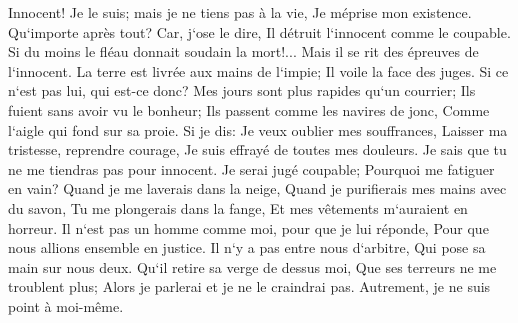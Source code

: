 \verse Innocent! Je le suis; mais je ne tiens pas à la vie, Je méprise mon existence. 
\verse Qu`importe après tout? Car, j`ose le dire, Il détruit l`innocent comme le coupable. 
\verse Si du moins le fléau donnait soudain la mort!... Mais il se rit des épreuves de l`innocent. 
\verse La terre est livrée aux mains de l`impie; Il voile la face des juges. Si ce n`est pas lui, qui est-ce donc? 
\verse Mes jours sont plus rapides qu`un courrier; Ils fuient sans avoir vu le bonheur; 
\verse Ils passent comme les navires de jonc, Comme l`aigle qui fond sur sa proie. 
\verse Si je dis: Je veux oublier mes souffrances, Laisser ma tristesse, reprendre courage, 
\verse Je suis effrayé de toutes mes douleurs. Je sais que tu ne me tiendras pas pour innocent. 
\verse Je serai jugé coupable; Pourquoi me fatiguer en vain? 
\verse Quand je me laverais dans la neige, Quand je purifierais mes mains avec du savon, 
\verse Tu me plongerais dans la fange, Et mes vêtements m`auraient en horreur. 
\verse Il n`est pas un homme comme moi, pour que je lui réponde, Pour que nous allions ensemble en justice. 
\verse Il n`y a pas entre nous d`arbitre, Qui pose sa main sur nous deux. 
\verse Qu`il retire sa verge de dessus moi, Que ses terreurs ne me troublent plus; 
\verse Alors je parlerai et je ne le craindrai pas. Autrement, je ne suis point à moi-même. 

